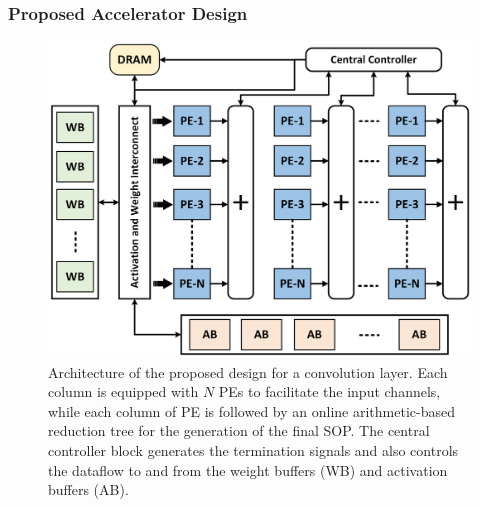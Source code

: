 \documentclass[conference]{IEEEtran}
\begin{document}
\subsubsection{Proposed Accelerator Design}


\begin{figure}[!ht]
    \centering
    \includegraphics[width=\linewidth]{DSLOT_extension_Arch.png}
    \caption{Architecture of the proposed design for a convolution layer. Each column is equipped with \(N\) PEs to facilitate the input channels, while each column of PE is followed by an online arithmetic-based reduction tree for the generation of the final SOP. The central controller block generates the termination signals and also controls the dataflow to and from the weight buffers (WB) and activation buffers (AB).}
    \label{fig:DSLOT}
\end{figure}
\end{document}
